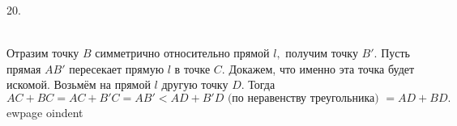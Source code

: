 20. \begin{figure}[ht!]
\end{figure}\\
Отразим точку $B$ симметрично относительно прямой $l,$ получим точку $B'.$ Пусть прямая $AB'$ пересекает прямую $l$ в точке $C.$ Докажем, что именно эта точка будет искомой. Возьмём на прямой $l$ другую точку $D.$ Тогда $AC+BC=AC+B'C=AB'<AD+B'D\text{ (по неравенству треугольника) }=AD+BD.$
ewpage
oindent

